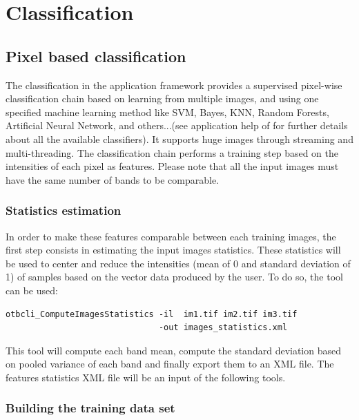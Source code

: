 \section{Classification}\label{sec:classification}

\subsection{Pixel based classification}\label{ssec:pbclassif}

The classification in the application framework provides a supervised pixel-wise
classification chain based on learning from multiple images, and using one 
specified machine learning method like SVM, Bayes, KNN, Random Forests, Artificial 
Neural Network, and others...(see application help of 
 for further details about all the available 
classifiers). It supports huge images through streaming and multi-threading. The 
classification chain performs a training step based on the intensities of each 
pixel as features. Please note that all the input images must have the same number 
of bands to be comparable.

\subsubsection{Statistics estimation}
In order to make these features comparable between each training images, the first 
step consists in estimating the input images statistics. These statistics will be 
used to center and reduce the intensities (mean of 0 and standard deviation of 1) 
of samples based on the vector data produced by the user. To do so, the
 tool can be used:

\begin{verbatim}
otbcli_ComputeImagesStatistics -il  im1.tif im2.tif im3.tif
                               -out images_statistics.xml
\end{verbatim}

This tool will compute each band mean, compute the standard deviation based on
pooled variance of each band and finally export them to an XML file.
The features statistics XML file will be an input of the following tools.

\subsubsection{Building the training data set}

